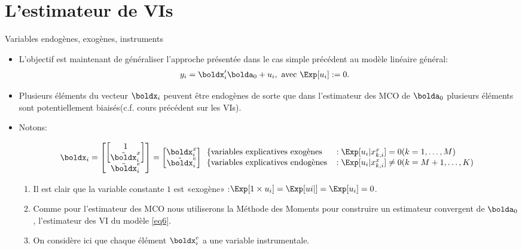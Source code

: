 \section{L'estimateur de VIs}
\frame{\sectionpage}
\begin{frame}[allowframebreaks]{Variables endogènes, exogènes, instruments}
\begin{itemize}
    \item L’objectif est maintenant de généraliser l’approche présentée dans
     le cas simple précédent au  modèle linéaire général:
    \begin{align}
        y_i&=\boldx_i^\prime\bolda_0 + u_i, \ \text{avec} \ \Exp[u_i] := 0.
        \label{eq6}
    \end{align}
    \item Plusieurs éléments du vecteur $\boldx_i$ 
    peuvent être endogènes de sorte que dans l'estimateur des MCO de $\bolda_0$ plusieurs
    éléments sont potentiellement biaisés(c.f. cours précédent sur les VIs). 
    \item Notons:

    \[\boldx_i = 
    \begin{bmatrix}
        \begin{bmatrix}
        1\\
        \tilde{\boldx}_i^x
        \end{bmatrix}\\
        \tilde{\boldx}_i^e
    \end{bmatrix} 
    =
    \begin{bmatrix}
        \boldx_i^x\\
        \tilde{\boldx}_i^e
    \end{bmatrix}
    \begin{array}{ll}
        \left\{ \text{variables explicatives exogènes}\right. &: \Exp[u_i|x_{k, i}^x] = 0 (k=1,\ldots,M)\\
        \left\{ \text{variables explicatives endogènes}\right.&: \Exp[u_i|x_{k, i}^x] \neq 0(k=M +1,\ldots,K)
    \end{array}
    \]
    \begin{remark_fr}
    \begin{enumerate}[$\star$]
        \item Il est clair que la variable constante $1$ est «exogène» :$\Exp[1\times u_i] =\Exp[ui|] 
        =\Exp[ u_i] =0$.
        \item Comme pour l'estimateur des MCO nous utiliserons la Méthode des Moments 
        pour construire un estimateur convergent de $\bolda_0$ , l’estimateur des VI 
        du modèle \eqref{eq6}.
        \item On considère ici que chaque élément $\boldx_i^e$ a une variable instrumentale.
    \end{enumerate}
    \end{remark_fr}


\end{itemize}
\end{frame}
